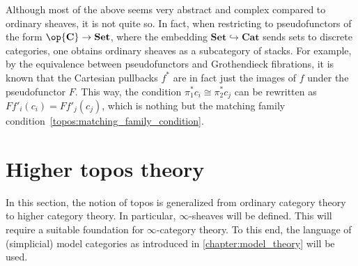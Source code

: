         \begin{remark}[1-sheaves]
            Although most of the above seems very abstract and complex compared to ordinary sheaves, it is not quite so. In fact, when restricting to pseudofunctors of the form $\op{\mathbf{C}}\rightarrow\mathbf{Set}$, where the embedding $\mathbf{Set}\hookrightarrow\mathbf{Cat}$ sends sets to discrete categories, one obtains ordinary sheaves as a subcategory of stacks. For example, by the equivalence between pseudofunctors and Grothendieck fibrations, it is known that the Cartesian pullbacks $f^*$ are in fact just the images of $f$ under the pseudofunctor $F$. This way, the condition $\pi_1^*c_i\cong\pi^*_2c_j$ can be rewritten as $Ff'_i(c_i)=Ff'_j(c_j)$, which is nothing but the matching family condition~\eqref{topos:matching_family_condition}.
        \end{remark}
    
    \section{Higher topos theory}
    
        In this section, the notion of topos is generalized from ordinary category theory to higher category theory. In particular, $\infty$-sheaves will be defined. This will require a suitable foundation for $\infty$-category theory. To this end, the language of (simplicial) model categories as introduced in \cref{chapter:model_theory} will be used.
    
    
